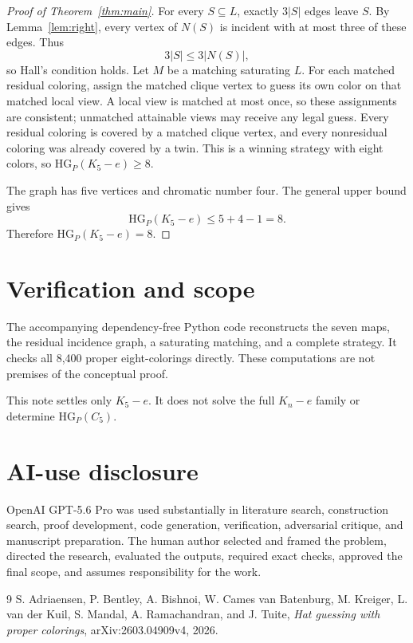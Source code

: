 \documentclass[11pt]{article}
\newcommand{\HGP}{\mathrm{HG}_{P}}
\begin{document}
\begin{proof}[Proof of Theorem~\ref{thm:main}]
For every $S\subseteq L$, exactly $3|S|$ edges leave $S$. By
Lemma~\ref{lem:right}, every vertex of $N(S)$ is incident with at most three
of these edges. Thus
\[
  3|S|\le 3|N(S)|,
\]
so Hall's condition holds. Let $M$ be a matching saturating $L$. For each
matched residual coloring, assign the matched clique vertex to guess its own
color on that matched local view. A local view is matched at most once, so
these assignments are consistent; unmatched attainable views may receive any
legal guess. Every residual coloring is covered by a matched clique vertex,
and every nonresidual coloring was already covered by a twin. This is a
winning strategy with eight colors, so $\HGP(K_5-e)\ge8$.

The graph has five vertices and chromatic number four. The general upper
bound gives
\[
  \HGP(K_5-e)\le5+4-1=8.
\]
Therefore $\HGP(K_5-e)=8$.
\end{proof}

\section{Verification and scope}
The accompanying dependency-free Python code reconstructs the seven maps,
the residual incidence graph, a saturating matching, and a complete strategy.
It checks all 8,400 proper eight-colorings directly. These computations are
not premises of the conceptual proof.

This note settles only $K_5-e$. It does not solve the full $K_n-e$ family or
determine $\HGP(C_5)$.

\section*{AI-use disclosure}
OpenAI GPT-5.6 Pro was used substantially in literature search, construction
search, proof development, code generation, verification, adversarial
critique, and manuscript preparation. The human author selected and framed
the problem, directed the research, evaluated the outputs, required exact
checks, approved the final scope, and assumes responsibility for the work.

\begin{thebibliography}{9}
S. Adriaensen, P. Bentley, A. Bishnoi, W. Cames van Batenburg, M. Kreiger,
L. van der Kuil, S. Mandal, A. Ramachandran, and J. Tuite,
\emph{Hat guessing with proper colorings}, arXiv:2603.04909v4, 2026.
\end{thebibliography}
\end{document}
